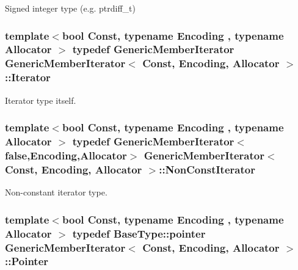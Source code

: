 Signed integer type (e.\+g. {\ttfamily ptrdiff\+\_\+t}) 

\subsubsection[{\texorpdfstring{Iterator}{Iterator}}]{\setlength{\rightskip}{0pt plus 5cm}template$<$bool Const, typename Encoding , typename Allocator $>$ typedef {\bf Generic\+Member\+Iterator} {\bf Generic\+Member\+Iterator}$<$ Const, Encoding, Allocator $>$\+::{\bf Iterator}}\hypertarget{classGenericMemberIterator_ad1cf1ecf6210b47906c9f179c893a8b8}{}\label{classGenericMemberIterator_ad1cf1ecf6210b47906c9f179c893a8b8}


Iterator type itself. 

\subsubsection[{\texorpdfstring{Non\+Const\+Iterator}{NonConstIterator}}]{\setlength{\rightskip}{0pt plus 5cm}template$<$bool Const, typename Encoding , typename Allocator $>$ typedef {\bf Generic\+Member\+Iterator}$<$false,Encoding,Allocator$>$ {\bf Generic\+Member\+Iterator}$<$ Const, Encoding, Allocator $>$\+::{\bf Non\+Const\+Iterator}}\hypertarget{classGenericMemberIterator_abc26eb06f2962765b11dcd06ce84ac02}{}\label{classGenericMemberIterator_abc26eb06f2962765b11dcd06ce84ac02}


Non-\/constant iterator type. 

\subsubsection[{\texorpdfstring{Pointer}{Pointer}}]{\setlength{\rightskip}{0pt plus 5cm}template$<$bool Const, typename Encoding , typename Allocator $>$ typedef Base\+Type\+::pointer {\bf Generic\+Member\+Iterator}$<$ Const, Encoding, Allocator $>$\+::{\bf Pointer}}\hypertarget{classGenericMemberIterator_ac69f141f1fde31c1f550f524a69c5de9}{}\label{classGenericMemberIterator_ac69f141f1fde31c1f550f524a69c5de9}


